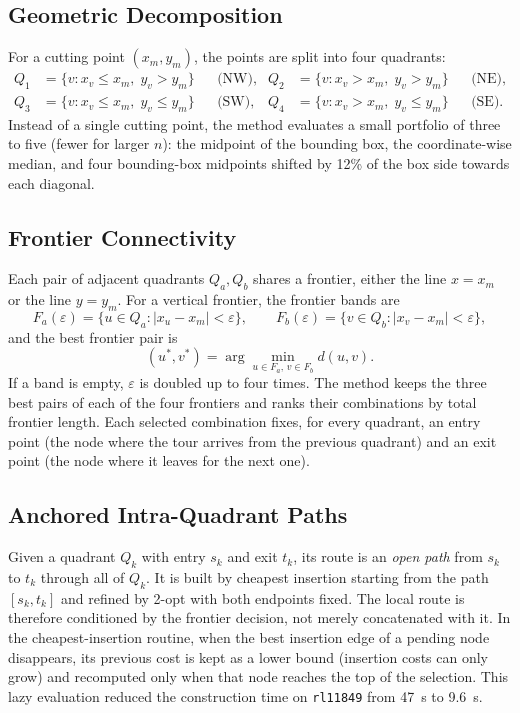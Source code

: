 \documentclass[runningheads]{llncs}
\begin{document}
\subsection{Geometric Decomposition}

For a cutting point $(x_m,y_m)$, the points are split into four
quadrants:
\begin{align}
Q_1&=\{v: x_v\le x_m,\; y_v>y_m\}  &&\text{(NW)}, &
Q_2&=\{v: x_v>x_m,\; y_v>y_m\}    &&\text{(NE)},\\
Q_3&=\{v: x_v\le x_m,\; y_v\le y_m\}&&\text{(SW)}, &
Q_4&=\{v: x_v>x_m,\; y_v\le y_m\} &&\text{(SE)}.
\end{align}
Instead of a single cutting point, the method evaluates a small
portfolio of three to five (fewer for larger $n$): the midpoint of the
bounding box, the coordinate-wise median, and four bounding-box
midpoints shifted by 12\% of the box side towards each diagonal.

\subsection{Frontier Connectivity}

Each pair of adjacent quadrants $Q_a,Q_b$ shares a frontier, either the
line $x=x_m$ or the line $y=y_m$. For a vertical frontier, the frontier
bands are
\begin{equation}
F_a(\varepsilon)=\{u\in Q_a:|x_u-x_m|<\varepsilon\}, \qquad
F_b(\varepsilon)=\{v\in Q_b:|x_v-x_m|<\varepsilon\},
\end{equation}
and the best frontier pair is
\begin{equation}
(u^*,v^*)=\arg\min_{u\in F_a,\,v\in F_b} d(u,v).
\label{eq:frontier}
\end{equation}
If a band is empty, $\varepsilon$ is doubled up to four times. The
method keeps the three best pairs of each of the four frontiers and
ranks their combinations by total frontier length. Each selected
combination fixes, for every quadrant, an entry point (the node where
the tour arrives from the previous quadrant) and an exit point (the node
where it leaves for the next one).

\subsection{Anchored Intra-Quadrant Paths}

Given a quadrant $Q_k$ with entry $s_k$ and exit $t_k$, its route is an
\emph{open path} from $s_k$ to $t_k$ through all of $Q_k$. It is built
by cheapest insertion starting from the path $[s_k,t_k]$ and refined by
2-opt with both endpoints fixed. The local route is therefore
conditioned by the frontier decision, not merely concatenated with it.
In the cheapest-insertion routine, when the best insertion edge of a
pending node disappears, its previous cost is kept as a lower bound
(insertion costs can only grow) and recomputed only when that node
reaches the top of the selection. This lazy evaluation reduced the
construction time on \texttt{rl11849} from 47~s to 9.6~s.
\end{document}
